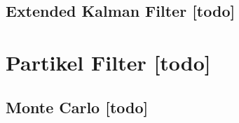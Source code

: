 \begin{comment}
	- Markov methods
		- Probability Grid
		- Robot-Position ist diskretisiert
		- Nutzen von Bayes Rule um Grids zu kombinieren/neuerzeugen
	- Monte Carlo Lokalisierung
		- Multimodal Distribution for position estimation
		- Important Sampling
- http://www.mathepedia.de/Stochastik.html

- Introduction to Mobile Robotics - SS 2017
	- http://ais.informatik.uni-freiburg.de/teaching/ss17/robotics/

- https://www.mrpt.org/tutorials/slam-algorithms/rangeonly_slam/



- Introduction_to_Kalman_Filtering.pdf
	
- Robot Mapping - WS 2016/17 - Uni-Freiburg
	- http://ais.informatik.uni-freiburg.de/teaching/ws16/mapping/
	- https://www.youtube.com/playlist?list=PLgnQpQtFTOGQrZ4O5QzbIHgl3b1JHimN_&feature=g-list
	
- Probabilistic Robotics
	- http://robots.stanford.edu/probabilistic-robotics/
\end{comment}




%
%
%
\subsection{Extended Kalman Filter [todo]}



%
%
%
\section{Partikel Filter [todo]}


\begin{comment}
------------------------------------------------------------------------------------------
- \cite{kurth2003experimental}
	- Monte Carlo localization, or particle filtering, provides a method of representing multimodal distri-butions for position estimation [4, 12], with the ad-vantage that the computational requirements can be scaled. The main advantage of these methods is their ability to recover robustly from a poor initial condition.
- \cite{fox1999monte}
\end{comment}
%
%
%
\subsection{Monte Carlo [todo]}


